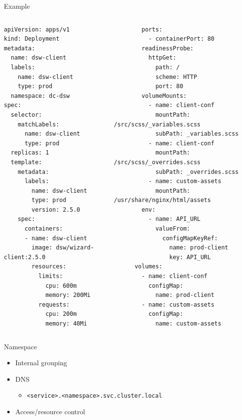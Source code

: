 \documentclass{dcpresentation}
\begin{document}
  \begin{frame}[fragile]{Example}
  \tiny
  \begin{columns}
\begin{verbatim}
apiVersion: apps/v1
kind: Deployment
metadata:
  name: dsw-client
  labels:
    name: dsw-client
    type: prod
  namespace: dc-dsw
spec:
  selector:
    matchLabels:
      name: dsw-client
      type: prod
  replicas: 1
  template:
    metadata:
      labels:
        name: dsw-client
        type: prod
        version: 2.5.0
    spec:
      containers:
      - name: dsw-client
        image: dsw/wizard-client:2.5.0
        resources:
          limits:
            cpu: 600m
            memory: 200Mi
          requests:
            cpu: 200m
            memory: 40Mi
    \end{verbatim}
  \begin{verbatim}
        ports:
          - containerPort: 80
        readinessProbe:
          httpGet:
            path: /
            scheme: HTTP
            port: 80
        volumeMounts:
          - name: client-conf
            mountPath: /src/scss/_variables.scss
            subPath: _variables.scss
          - name: client-conf
            mountPath: /src/scss/_overrides.scss
            subPath: _overrides.scss
          - name: custom-assets
            mountPath: /usr/share/nginx/html/assets
        env:
          - name: API_URL
            valueFrom:
              configMapKeyRef:
                name: prod-client
                key: API_URL
      volumes:
        - name: client-conf
          configMap:
            name: prod-client
        - name: custom-assets
          configMap:
            name: custom-assets

  \end{verbatim}
  \end{columns}
 \end{frame}
 
 \begin{frame}{Namespace}
  \begin{itemize}
   \item Internal grouping
   \item DNS
   \begin{itemize}
    \item \texttt{<service>.<namespace>.svc.cluster.local}
   \end{itemize}
   \item Access/resource control
  \end{itemize}
 \end{frame}
 
\end{document}
